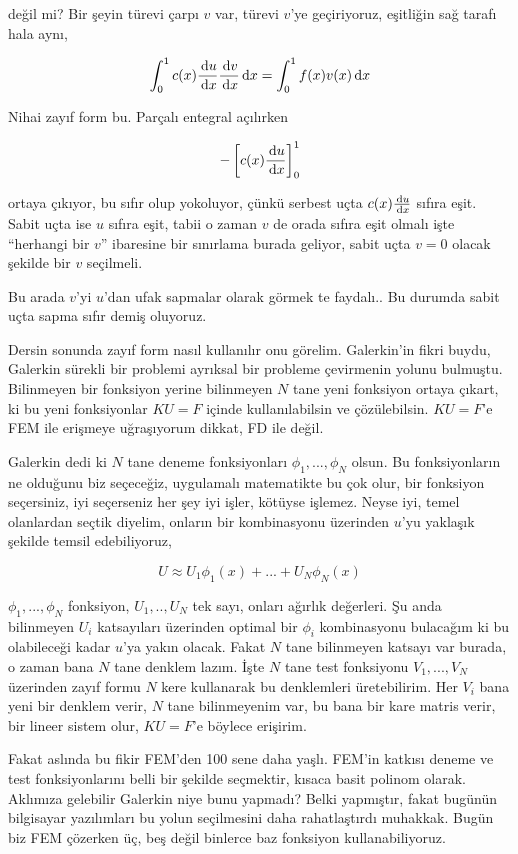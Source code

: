 \documentclass[12pt,fleqn]{article}\usepackage{../../common}
\begin{document}
değil mi? Bir şeyin türevi çarpı $v$ var, türevi $v$'ye geçiriyoruz, eşitliğin
sağ tarafı hala aynı,

$$
\int _{0}^{1} c(x) \frac{\,\mathrm{d} u}{\,\mathrm{d} x} \frac{\,\mathrm{d} v}{\,\mathrm{d} x} \,\mathrm{d} x =
\int_{0}^{1} f(x) v(x) \,\mathrm{d} x
$$

Nihai zayıf form bu. Parçalı entegral açılırken

$$
- \left[ c(x) \frac{\,\mathrm{d} u}{\,\mathrm{d} x}  \right]_{0}^{1}
$$

ortaya çıkıyor, bu sıfır olup yokoluyor, çünkü serbest uçta $c(x) \frac{\,\mathrm{d} u}{\,\mathrm{d} x}$
sıfıra eşit. Sabit uçta ise $u$ sıfıra eşit, tabii o zaman $v$ de orada sıfıra
eşit olmalı işte ``herhangi bir $v$'' ibaresine bir sınırlama burada geliyor,
sabit uçta $v=0$ olacak şekilde bir $v$ seçilmeli.

Bu arada $v$'yi $u$'dan ufak sapmalar olarak görmek te faydalı.. Bu durumda
sabit uçta sapma sıfır demiş oluyoruz.

Dersin sonunda zayıf form nasıl kullanılır onu görelim. Galerkin'in fikri buydu,
Galerkin sürekli bir problemi ayrıksal bir probleme çevirmenin yolunu bulmuştu.
Bilinmeyen bir fonksiyon yerine bilinmeyen $N$ tane yeni fonksiyon ortaya
çıkart, ki bu yeni fonksiyonlar $KU = F$ içinde kullanılabilsin ve çözülebilsin.
$KU=F$'e FEM ile erişmeye uğraşıyorum dikkat, FD ile değil.

Galerkin dedi ki $N$ tane deneme fonksiyonları $\phi_1,...,\phi_N$ olsun. Bu
fonksiyonların ne olduğunu biz seçeceğiz, uygulamalı matematikte bu çok olur,
bir fonksiyon seçersiniz, iyi seçerseniz her şey iyi işler, kötüyse işlemez.
Neyse iyi, temel olanlardan seçtik diyelim, onların bir kombinasyonu üzerinden
$u$'yu yaklaşık şekilde temsil edebiliyoruz,

$$
U \approx U_1 \phi_1(x) + ... + U_N \phi_N(x)
$$

$\phi_1,...,\phi_N$ fonksiyon, $U_1,..,U_N$ tek sayı, onları ağırlık değerleri.
Şu anda bilinmeyen $U_i$ katsayıları üzerinden optimal bir $\phi_i$ kombinasyonu
bulacağım ki bu olabileceği kadar $u$'ya yakın olacak. Fakat $N$ tane bilinmeyen
katsayı var burada, o zaman bana $N$ tane denklem lazım. İşte $N$ tane test
fonksiyonu $V_1,...,V_N$ üzerinden zayıf formu $N$ kere kullanarak bu
denklemleri üretebilirim. Her $V_i$ bana yeni bir denklem verir, $N$ tane
bilinmeyenim var, bu bana bir kare matris verir, bir lineer sistem olur, 
$KU = F$'e böylece erişirim.

Fakat aslında bu fikir FEM'den 100 sene daha yaşlı. FEM'in katkısı deneme ve
test fonksiyonlarını belli bir şekilde seçmektir, kısaca basit polinom
olarak. Aklımıza gelebilir Galerkin niye bunu yapmadı? Belki yapmıştır, fakat
bugünün bilgisayar yazılımları bu yolun seçilmesini daha rahatlaştırdı muhakkak.
Bugün biz FEM çözerken üç, beş değil binlerce baz fonksiyon kullanabiliyoruz.
\end{document}
